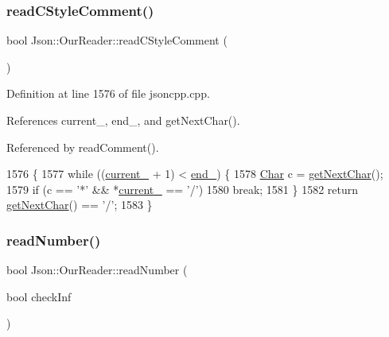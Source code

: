\subsubsection{\texorpdfstring{read\+C\+Style\+Comment()}{readCStyleComment()}}
{\footnotesize\ttfamily bool Json\+::\+Our\+Reader\+::read\+C\+Style\+Comment (\begin{DoxyParamCaption}{ }\end{DoxyParamCaption})\hspace{0.3cm}{\ttfamily [private]}}



Definition at line 1576 of file jsoncpp.\+cpp.



References current\+\_\+, end\+\_\+, and get\+Next\+Char().



Referenced by read\+Comment().


\begin{DoxyCode}
1576                                   \{
1577   \textcolor{keywordflow}{while} ((\hyperlink{class_json_1_1_our_reader_a5211fbbba94be80a22dd2317c621efcc}{current\_} + 1) < \hyperlink{class_json_1_1_our_reader_ab1f69b0260c27a0d2d65dc56e42c8f9d}{end\_}) \{
1578     \hyperlink{class_json_1_1_our_reader_a0cd0bab4caa66594ab843ccd5f9dc239}{Char} c = \hyperlink{class_json_1_1_our_reader_a298285d035fdbc554caae09d9f0a5859}{getNextChar}();
1579     \textcolor{keywordflow}{if} (c == \textcolor{charliteral}{'*'} && *\hyperlink{class_json_1_1_our_reader_a5211fbbba94be80a22dd2317c621efcc}{current\_} == \textcolor{charliteral}{'/'})
1580       \textcolor{keywordflow}{break};
1581   \}
1582   \textcolor{keywordflow}{return} \hyperlink{class_json_1_1_our_reader_a298285d035fdbc554caae09d9f0a5859}{getNextChar}() == \textcolor{charliteral}{'/'};
1583 \}
\end{DoxyCode}
\mbox{\label{class_json_1_1_our_reader_aefcb9a78cc45870ccac2db2a66c8ec50}} 
\subsubsection{\texorpdfstring{read\+Number()}{readNumber()}}
{\footnotesize\ttfamily bool Json\+::\+Our\+Reader\+::read\+Number (\begin{DoxyParamCaption}\item[{bool}]{check\+Inf }\end{DoxyParamCaption})\hspace{0.3cm}{\ttfamily [private]}}




